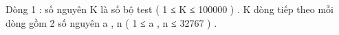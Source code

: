 Dòng 1 : số nguyên K là số bộ test ( 1 ≤ K ≤ 100000 ) . K dòng tiếp theo mỗi dòng gồm 2 số nguyên a , n (  1 ≤ a , n ≤ 32767 ) .